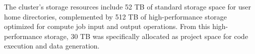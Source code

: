         
        

            
            
            

        

    
The cluster's storage resources include 52 TB of standard storage space for 
user home directories, complemented by 512 TB of high-performance storage 
optimized for compute job input and output operations. From this 
high-performance storage, 30 TB was specifically allocated as project space 
for code execution and data generation.



